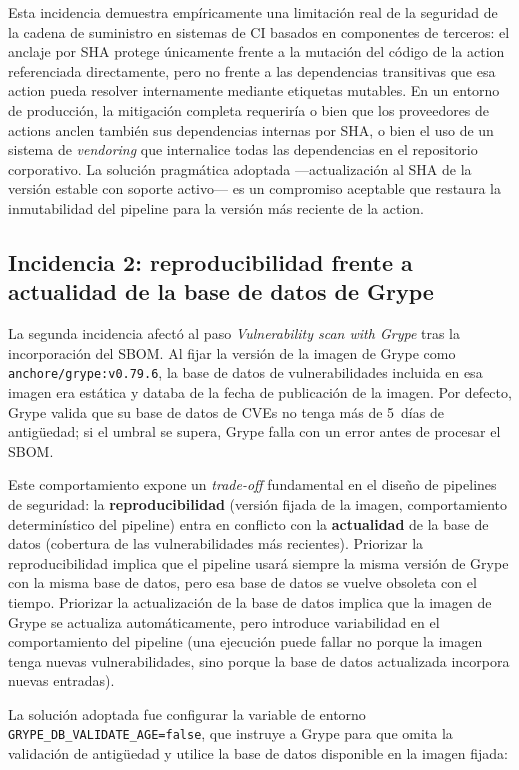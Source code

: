 Esta incidencia demuestra empíricamente una limitación real de la seguridad de la cadena de suministro en sistemas de CI basados en componentes de terceros: el anclaje por SHA protege únicamente frente a la mutación del código de la action referenciada directamente, pero no frente a las dependencias transitivas que esa action pueda resolver internamente mediante etiquetas mutables. En un entorno de producción, la mitigación completa requeriría o bien que los proveedores de actions anclen también sus dependencias internas por SHA, o bien el uso de un sistema de \textit{vendoring} que internalice todas las dependencias en el repositorio corporativo. La solución pragmática adoptada ---actualización al SHA de la versión estable con soporte activo--- es un compromiso aceptable que restaura la inmutabilidad del pipeline para la versión más reciente de la action.

\subsection{Incidencia 2: reproducibilidad frente a actualidad de la base de datos de Grype}

La segunda incidencia afectó al paso \textit{Vulnerability scan with Grype} tras la incorporación del SBOM. Al fijar la versión de la imagen de Grype como \texttt{anchore/grype:v0.79.6}, la base de datos de vulnerabilidades incluida en esa imagen era estática y databa de la fecha de publicación de la imagen. Por defecto, Grype valida que su base de datos de CVEs no tenga más de 5~días de antigüedad; si el umbral se supera, Grype falla con un error antes de procesar el SBOM.

Este comportamiento expone un \textit{trade-off} fundamental en el diseño de pipelines de seguridad: la \textbf{reproducibilidad} (versión fijada de la imagen, comportamiento determinístico del pipeline) entra en conflicto con la \textbf{actualidad} de la base de datos (cobertura de las vulnerabilidades más recientes). Priorizar la reproducibilidad implica que el pipeline usará siempre la misma versión de Grype con la misma base de datos, pero esa base de datos se vuelve obsoleta con el tiempo. Priorizar la actualización de la base de datos implica que la imagen de Grype se actualiza automáticamente, pero introduce variabilidad en el comportamiento del pipeline (una ejecución puede fallar no porque la imagen tenga nuevas vulnerabilidades, sino porque la base de datos actualizada incorpora nuevas entradas).

La solución adoptada fue configurar la variable de entorno \texttt{GRYPE\_DB\_VALIDATE\_AGE=false}, que instruye a Grype para que omita la validación de antigüedad y utilice la base de datos disponible en la imagen fijada:

